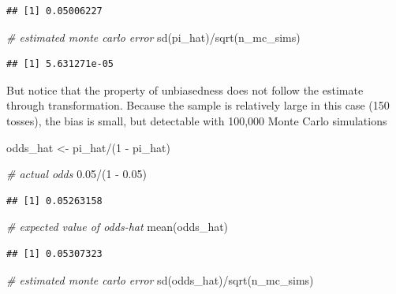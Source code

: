 \documentclass[
]{book}
\newenvironment{Shaded}{\begin{snugshade}}{\end{snugshade}}
\newcommand{\CommentTok}[1]{\textcolor[rgb]{0.56,0.35,0.01}{\textit{#1}}}
\newcommand{\DecValTok}[1]{\textcolor[rgb]{0.00,0.00,0.81}{#1}}
\newcommand{\FloatTok}[1]{\textcolor[rgb]{0.00,0.00,0.81}{#1}}
\newcommand{\FunctionTok}[1]{\textcolor[rgb]{0.00,0.00,0.00}{#1}}
\newcommand{\NormalTok}[1]{#1}
\newcommand{\OtherTok}[1]{\textcolor[rgb]{0.56,0.35,0.01}{#1}}
\newcommand{\SpecialCharTok}[1]{\textcolor[rgb]{0.00,0.00,0.00}{#1}}
\begin{document}
\begin{verbatim}
## [1] 0.05006227
\end{verbatim}

\begin{Shaded}
\begin{Highlighting}[]
\CommentTok{\# estimated monte carlo error}
\FunctionTok{sd}\NormalTok{(pi\_hat)}\SpecialCharTok{/}\FunctionTok{sqrt}\NormalTok{(n\_mc\_sims)}
\end{Highlighting}
\end{Shaded}

\begin{verbatim}
## [1] 5.631271e-05
\end{verbatim}

But notice that the property of unbiasedness does not follow the
estimate through transformation. Because the sample is relatively large
in this case (150 tosses), the bias is small, but detectable with
100,000 Monte Carlo simulations

\begin{Shaded}
\begin{Highlighting}[]
\NormalTok{odds\_hat }\OtherTok{\textless{}{-}}\NormalTok{ pi\_hat}\SpecialCharTok{/}\NormalTok{(}\DecValTok{1} \SpecialCharTok{{-}}\NormalTok{ pi\_hat)}

\CommentTok{\# actual odds}
\FloatTok{0.05}\SpecialCharTok{/}\NormalTok{(}\DecValTok{1} \SpecialCharTok{{-}} \FloatTok{0.05}\NormalTok{)}
\end{Highlighting}
\end{Shaded}

\begin{verbatim}
## [1] 0.05263158
\end{verbatim}

\begin{Shaded}
\begin{Highlighting}[]
\CommentTok{\# expected value of odds{-}hat}
\FunctionTok{mean}\NormalTok{(odds\_hat)}
\end{Highlighting}
\end{Shaded}

\begin{verbatim}
## [1] 0.05307323
\end{verbatim}

\begin{Shaded}
\begin{Highlighting}[]
\CommentTok{\# estimated monte carlo error}
\FunctionTok{sd}\NormalTok{(odds\_hat)}\SpecialCharTok{/}\FunctionTok{sqrt}\NormalTok{(n\_mc\_sims)}
\end{Highlighting}
\end{Shaded}
\end{document}
